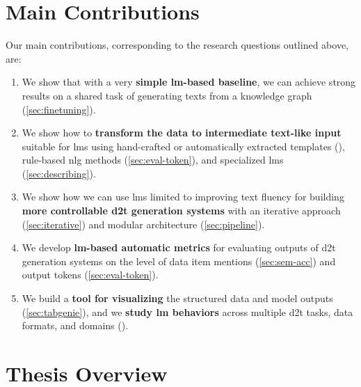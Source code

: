 \section{Main Contributions}
\label{sec:contributions}


Our main contributions, corresponding to the research questions outlined above, are:
\begin{enumerate}
    \item We show that with a very \textbf{simple \ac{lm}-based baseline}, we can achieve strong results on a shared task of generating texts from a knowledge graph (\autoref{sec:finetuning}).
    \item We show how to \textbf{transform the data to intermediate text-like input} suitable for \acp{lm} using hand-crafted or automatically extracted templates (), rule-based \ac{nlg} methods (\autoref{sec:eval-token}), and specialized \acp{lm} (\autoref{sec:describing}).
    \item We show how we can use \acp{lm} limited to improving text fluency for building \textbf{more controllable \ac{d2t} generation systems} with an iterative approach (\autoref{sec:iterative}) and modular architecture (\autoref{sec:pipeline}).
    \item We develop \textbf{\ac{lm}-based automatic metrics} for evaluating outputs of \ac{d2t} generation systems on the level of data item mentions (\autoref{sec:sem-acc}) and output tokens (\autoref{sec:eval-token}).
    \item We build a \textbf{tool for visualizing} the structured data and model outputs (\autoref{sec:tabgenie}), and we \textbf{study \ac{lm} behaviors} across multiple \ac{d2t} tasks, data formats, and domains ().
\end{enumerate}



\section{Thesis Overview}
\label{sec:overview}


